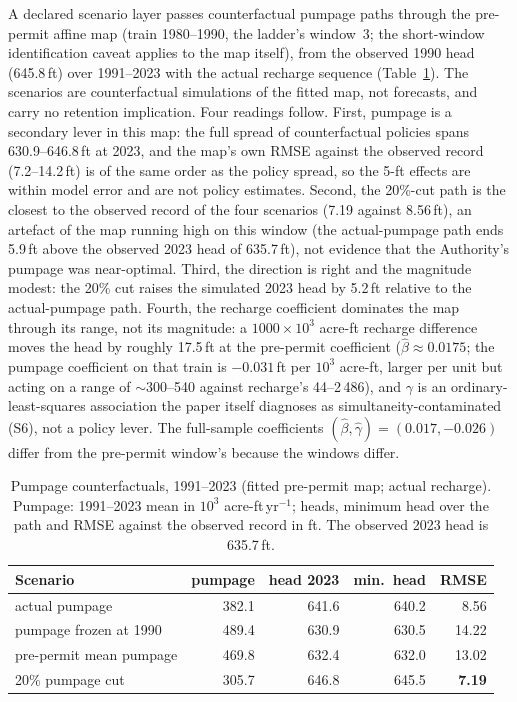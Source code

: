 \documentclass[11pt]{article}
\begin{document}
A declared scenario layer passes counterfactual pumpage paths through the pre-permit affine map (train 1980--1990, the ladder's window~3; the short-window identification caveat applies to the map itself), from the observed 1990 head (645.8\,ft) over 1991--2023 with the actual recharge sequence (Table~\ref{tab:si_pumpage}). The scenarios are counterfactual simulations of the fitted map, not forecasts, and carry no retention implication. Four readings follow. First, pumpage is a secondary lever in this map: the full spread of counterfactual policies spans 630.9--646.8\,ft at 2023, and the map's own RMSE against the observed record (7.2--14.2\,ft) is of the same order as the policy spread, so the 5-ft effects are within model error and are not policy estimates. Second, the 20\%-cut path is the closest to the observed record of the four scenarios (7.19 against 8.56\,ft), an artefact of the map running high on this window (the actual-pumpage path ends 5.9\,ft above the observed 2023 head of 635.7\,ft), not evidence that the Authority's pumpage was near-optimal. Third, the direction is right and the magnitude modest: the 20\% cut raises the simulated 2023 head by 5.2\,ft relative to the actual-pumpage path. Fourth, the recharge coefficient dominates the map through its range, not its magnitude: a $1000\times10^3$ acre-ft recharge difference moves the head by roughly 17.5\,ft at the pre-permit coefficient ($\hat\beta\approx0.0175$; the pumpage coefficient on that train is $-0.031$\,ft per $10^3$ acre-ft, larger per unit but acting on a range of $\sim$300--540 against recharge's 44--2\,486), and $\gamma$ is an ordinary-least-squares association the paper itself diagnoses as simultaneity-contaminated (S6), not a policy lever. The full-sample coefficients $(\hat\beta,\hat\gamma)=(0.017,-0.026)$ differ from the pre-permit window's because the windows differ.

\begin{table}[!htb]
\centering\small
\caption{Pumpage counterfactuals, 1991--2023 (fitted pre-permit map; actual recharge). Pumpage: 1991--2023 mean in $10^3$ acre-ft\,yr$^{-1}$; heads, minimum head over the path and RMSE against the observed record in ft. The observed 2023 head is 635.7\,ft.}
\label{tab:si_pumpage}
\begin{tabular}{@{}lrrrr@{}}
\toprule
Scenario & pumpage & head 2023 & min.\ head & RMSE \\
\midrule
actual pumpage & 382.1 & 641.6 & 640.2 & 8.56 \\
pumpage frozen at 1990 & 489.4 & 630.9 & 630.5 & 14.22 \\
pre-permit mean pumpage & 469.8 & 632.4 & 632.0 & 13.02 \\
20\% pumpage cut & 305.7 & 646.8 & 645.5 & \textbf{7.19} \\
\bottomrule
\end{tabular}
\end{table}
\end{document}

